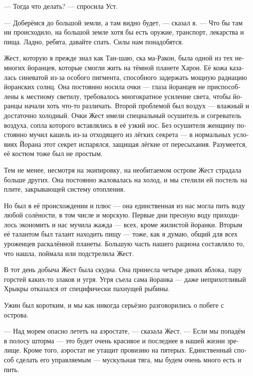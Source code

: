 \documentclass[a4paper,10pt,fleqn]{book}\usepackage{polyglossia}\setdefaultlanguage[babelshorthands=true]{russian}\setotherlanguage{english}\defaultfontfeatures{Ligatures=TeX,Mapping=tex-text}
\newcommand{\asterism}{\vspace{1em}{\centering\Large\bfseries$\ast~\ast~\ast$\par}\vspace{1em}}
\begin{document}
--- Тогда что делать? --- спросила Уст.

--- Доберёмся до большой земли, а там видно будет, --- сказал я.
--- Что бы там ни происходило, на большой земле хотя бы есть оружие, транспорт, лекарства и пища.
Ладно, ребята, давайте спать.
Силы нам понадобятся.

\asterism

Жест, которую я прежде знал как Тан-шаю, ска ма-Ракон, была одной из тех немногих йоранцев, которые смогли жить на тёмной планете Харон.
Её кожа казалась синеватой из-за особого пигмента, способного задержать мощную радиацию йоранских солнц.
Она постоянно носила очки --- глаза йоранцев не приспособлены к местному светилу, требовалось многократное усиление света, чтобы йоранцы начали хоть что-то различать.
Второй проблемой был воздух --- влажный и достаточно холодный.
Очки Жест имели специальный осушитель и согреватель воздуха, сопла которого вставлялись в её узкий нос.
Без осушителя женщину постоянно мучил кашель из-за отходящего из лёгких секрета --- в нормальных условиях Йорана этот секрет испарялся, защищая лёгкие от пересыхания.
Разумеется, её костюм тоже был не простым.

Тем не менее, несмотря на экипировку, на необитаемом острове Жест страдала больше других.
Она постоянно жаловалась на холод, и мы стелили ей постель на плите, закрывающей систему отопления.

Но был в её происхождении и плюс --- она единственная из нас могла пить воду любой солёности, в том числе и морскую.
Первые дни пресную воду приходилось экономить и нас мучила жажда --- всех, кроме жилистой йоранки.
Вторым её талантом был талант находить пищу --- тоже, как я думаю, общий для всех уроженцев раскалённой планеты.
Большую часть нашего рациона составляло то, что нашла, поймала или подстрелила Жест.

\asterism

В тот день добыча Жест была скудна.
Она принесла четыре диких яблока, пару горстей каких-то злаков и угря.
Угря съела сама йоранка --- даже неприхотливый Хрыкры отказался от специфически пахнущей рыбины.

Ужин был коротким, и мы как никогда серьёзно разговорились о побеге с острова. 

--- Над морем опасно лететь на аэростате, --- сказала Жест.
--- Если мы попадём в полосу шторма --- это будет очень красивое и последнее в нашей жизни зрелище.
Кроме того, аэростат не утащит провизию на пятерых.
Единственный способ сделать его управляемым --- мускульная тяга, мы будем очень много есть и пить.
\end{document}
